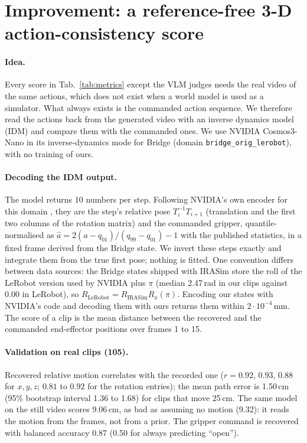 \section{Improvement: a reference-free 3-D action-consistency score}
\label{sec:improve}

\paragraph{Idea.}
Every score in Tab.~\ref{tab:metrics} except the VLM judges needs the real video of the same actions, which does not exist when a world model is used as a simulator.
What always exists is the commanded action sequence.
We therefore read the actions back from the generated video with an inverse dynamics model (IDM) and compare them with the commanded ones.
We use NVIDIA Cosmos3-Nano \cite{nvidia2026cosmos3} in its inverse-dynamics mode for Bridge (domain \texttt{bridge\_orig\_lerobot}), with no training of ours.

\paragraph{Decoding the IDM output.}
The model returns 10 numbers per step.
Following NVIDIA's own encoder for this domain \cite{nvidia2026framework}, they are the step's relative pose $T_i^{-1}T_{i+1}$ (translation and the first two columns of the rotation matrix) and the commanded gripper, quantile-normalised as $\hat a = 2(a-q_{01})/(q_{99}-q_{01})-1$ with the published statistics, in a fixed frame derived from the Bridge state.
We invert these steps exactly and integrate them from the true first pose; nothing is fitted.
One convention differs between data sources: the Bridge states shipped with IRASim store the roll of the LeRobot version used by NVIDIA plus $\pi$ (median 2.47\,rad in our clips against 0.00 in LeRobot), so $R_{\text{LeRobot}}=R_{\text{IRASim}}R_x(\pi)$.
Encoding our states with NVIDIA's code and decoding them with ours returns them within $2\cdot10^{-4}$\,mm.
The score of a clip is the mean distance between the recovered and the commanded end-effector positions over frames 1 to 15.

\paragraph{Validation on real clips (105).}
Recovered relative motion correlates with the recorded one ($r=0.92$, $0.93$, $0.88$ for $x,y,z$; $0.81$ to $0.92$ for the rotation entries); the mean path error is 1.50\,cm (95\% bootstrap interval 1.36 to 1.68) for clips that move 25\,cm.
The same model on the still video scores 9.06\,cm, as bad as assuming no motion (9.32): it reads the motion from the frames, not from a prior.
The gripper command is recovered with balanced accuracy 0.87 (0.50 for always predicting ``open'').

